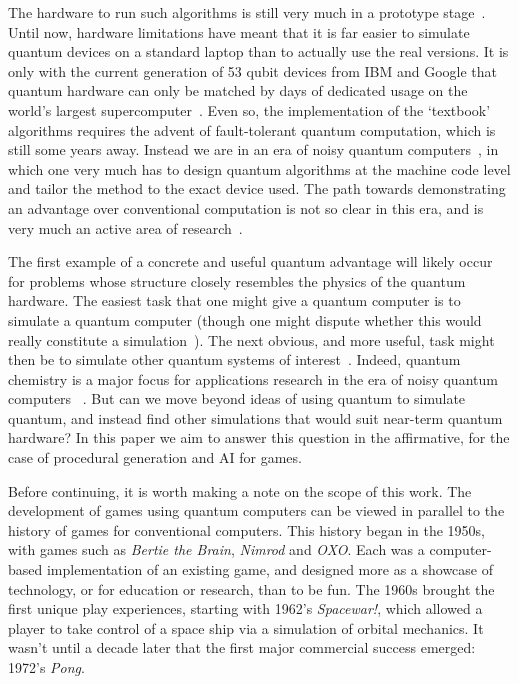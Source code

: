\documentclass[conference]{IEEEtran}
\begin{document}
The hardware to run such algorithms is still very much in a prototype stage~\cite{quantum-volume}. Until now, hardware limitations have meant that it is far easier to simulate quantum devices on a standard laptop than to actually use the real versions. It is only with the current generation of 53 qubit devices from IBM and Google that quantum hardware can only be matched by days of dedicated usage on the world’s largest supercomputer~\cite{google-supremacy,ibm-summit}. Even so, the implementation of the ‘textbook’ algorithms requires the advent of fault-tolerant quantum computation, which is still some years away. Instead we are in an era of noisy quantum computers~\cite{nisq}, in which one very much has to design quantum algorithms at the machine code level and tailor the method to the exact device used. The path towards demonstrating an advantage over conventional computation is not so clear in this era, and is very much an active area of research~\cite{ibm-nisq}.

The first example of a concrete and useful quantum advantage will likely occur for problems whose structure closely resembles the physics of the quantum hardware. The easiest task that one might give a quantum computer is to simulate a quantum computer (though one might dispute whether this would really constitute a simulation~\cite{horsman:13}). The next obvious, and more useful, task might then be to simulate other quantum systems of interest~\cite{feynman}. Indeed, quantum chemistry is a major focus for applications research in the era of noisy quantum computers~\cite{kandala:17,ganzhorn:19} . But can we move beyond ideas of using quantum to simulate quantum, and instead find other simulations that would suit near-term quantum hardware? In this paper we aim to answer this question in the affirmative, for the case of procedural generation and AI for games.

Before continuing, it is worth making a note on the scope of this work. The development of games using quantum computers can be viewed in parallel to the history of games for conventional computers. This history began in the 1950s, with games such as  \textit{Bertie the Brain},  \textit{Nimrod} and  \textit{OXO}. Each was a computer-based implementation of an existing game, and designed more as a showcase of technology, or for education or research, than to be fun. The 1960s brought the first unique play experiences, starting with 1962’s \textit{Spacewar!}, which allowed a player to take control of a space ship via a simulation of orbital mechanics. It wasn’t until a decade later that the first major commercial success emerged: 1972’s  \textit{Pong}.
\end{document}
